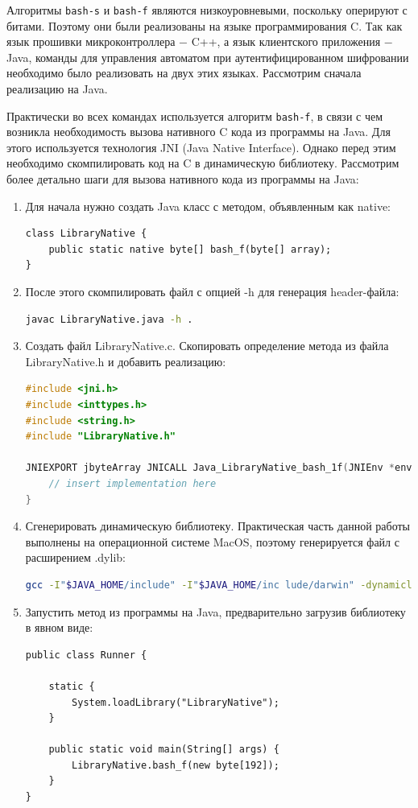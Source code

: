 	Алгоритмы \texttt{bash-s} и \texttt{bash-f} являются низкоуровневыми, поскольку оперируют с битами. Поэтому они 
	были реализованы на языке программирования C. Так как язык прошивки микроконтроллера $-$ C++,
	а язык клиентского приложения $-$ Java, команды для управления автоматом при аутентифицированном 
	шифровании необходимо было реализовать на двух этих языках. Рассмотрим сначала реализацию на Java.
	
	Практически во всех командах используется алгоритм \texttt{bash-f}, в связи с чем возникла необходимость
	вызова нативного C кода из программы на Java. Для этого используется технология JNI (Java 
	Native Interface). Однако перед этим необходимо скомпилировать код на C в динамическую библиотеку.
	Рассмотрим более детально шаги для вызова нативного кода из программы на Java:
	
	\begin{enumerate}
		\item Для начала нужно создать Java класс с методом, объявленным как native:
		\begin{lstlisting}
class LibraryNative {
	public static native byte[] bash_f(byte[] array);
}
		\end{lstlisting}
		\item После этого скомпилировать файл с опцией -h для генерация header-файла:
		\begin{lstlisting}[language=Bash]
javac LibraryNative.java -h .
		\end{lstlisting}
		\item Создать файл LibraryNative.c. Скопировать определение метода из файла LibraryNative.h
		и добавить реализацию:
		\begin{lstlisting}[language=C]
#include <jni.h>
#include <inttypes.h>
#include <string.h>
#include "LibraryNative.h"

JNIEXPORT jbyteArray JNICALL Java_LibraryNative_bash_1f(JNIEnv *env, jclass thisClass, jbyteArray inJNIArray) {
	// insert implementation here
}
		\end{lstlisting}
		\item Сгенерировать динамическую библиотеку. Практическая часть данной работы выполнены на 
		операционной системе MacOS, поэтому генерируется файл с расширением .dylib:
		\begin{lstlisting}[language=Bash]
gcc -I"$JAVA_HOME/include" -I"$JAVA_HOME/inc lude/darwin" -dynamiclib -o libLibraryNative.dylib LibraryNative.c
		\end{lstlisting}
		\item Запустить метод из программы на Java, предварительно загрузив библиотеку в явном виде:
		\begin{lstlisting}
public class Runner {
	
	static {
		System.loadLibrary("LibraryNative");
	}

	public static void main(String[] args) {
		LibraryNative.bash_f(new byte[192]);
	}
}
		\end{lstlisting}
	\end{enumerate}

